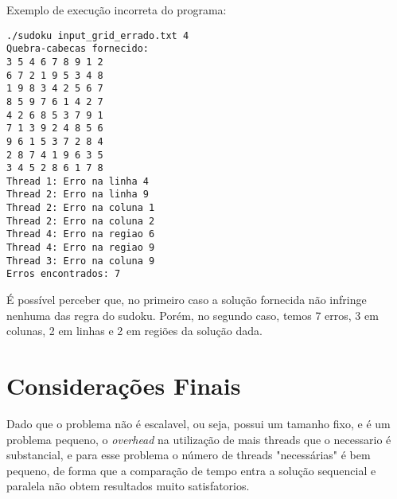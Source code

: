 \documentclass[a4paper, 12pt]{article}
\begin{document}
Exemplo de execução incorreta do programa:
\begin{verbatim}
./sudoku input_grid_errado.txt 4
Quebra-cabecas fornecido:
3 5 4 6 7 8 9 1 2
6 7 2 1 9 5 3 4 8
1 9 8 3 4 2 5 6 7
8 5 9 7 6 1 4 2 7
4 2 6 8 5 3 7 9 1
7 1 3 9 2 4 8 5 6
9 6 1 5 3 7 2 8 4
2 8 7 4 1 9 6 3 5
3 4 5 2 8 6 1 7 8
Thread 1: Erro na linha 4
Thread 2: Erro na linha 9
Thread 2: Erro na coluna 1
Thread 2: Erro na coluna 2
Thread 4: Erro na regiao 6
Thread 4: Erro na regiao 9
Thread 3: Erro na coluna 9
Erros encontrados: 7
\end{verbatim}

É possível perceber que, no primeiro caso a solução fornecida não infringe
nenhuma das regra do sudoku. Porém, no segundo caso, temos 7 erros, 3 em
colunas, 2 em linhas e 2 em regiões da solução dada.

\section{Considerações Finais}
Dado que o problema não é escalavel, ou seja, possui um tamanho fixo, e é um
problema pequeno, o \textit{overhead} na utilização de mais threads que o
necessario é substancial, e para esse problema o número de threads "necessárias"
é bem pequeno,  de forma que a comparação de tempo entra a solução sequencial e
paralela não obtem resultados muito satisfatorios.
\end{document}
